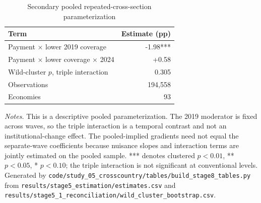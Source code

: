 \begin{table}[htbp]
\centering
\caption{Secondary pooled repeated-cross-section parameterization}
\label{tab:stage8pooled}
\begin{tabular}{lr}
\toprule
Term & Estimate (pp) \\
\midrule
Payment $\times$ lower 2019 coverage & -1.98*** \\
Payment $\times$ lower coverage $\times$ 2024 & +0.58 \\
Wild-cluster $p$, triple interaction & 0.305 \\
Observations & 194,558 \\
Economies & 93 \\
\bottomrule
\end{tabular}
\smallskip
\begin{minipage}{0.92\linewidth}\footnotesize \emph{Notes.}
This is a descriptive pooled parameterization. The 2019 moderator is fixed across
waves, so the triple interaction is a temporal contrast and not an institutional-change
effect. The pooled-implied gradients need not equal the separate-wave coefficients
because nuisance slopes and interaction terms are jointly estimated on the pooled sample.
*** denotes clustered $p<0.01$, ** $p<0.05$, * $p<0.10$; the triple interaction is not
significant at conventional levels. Generated by
\texttt{code/\allowbreak{}study\_05\_crosscountry/\allowbreak{}tables/\allowbreak{}build\_stage8\_tables.py} from
\texttt{results/\allowbreak{}stage5\_estimation/\allowbreak{}estimates.csv} and
\texttt{results/\allowbreak{}stage5\_1\_reconciliation/\allowbreak{}wild\_cluster\_bootstrap.csv}.
\end{minipage}
\end{table}
